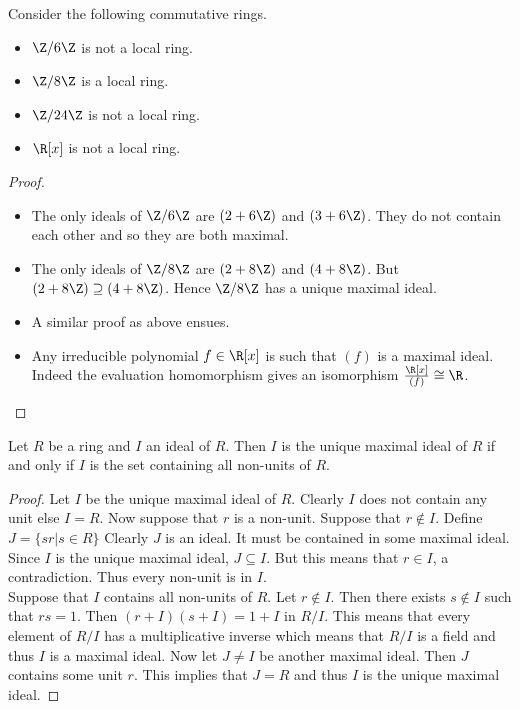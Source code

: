 \documentclass[a4paper]{article}
\begin{document}
\begin{eg}{}{} Consider the following commutative rings. 
\begin{itemize}
\item $\Z/6\Z$ is not a local ring. 
\item $\Z/8\Z$ is a local ring. 
\item $\Z/24\Z$ is not a local ring. 
\item $\R[x]$ is not a local ring. 
\end{itemize} 
\begin{proof}
\begin{itemize}
\item The only ideals of $\Z/6\Z$ are $(2+6\Z)$ and $(3+6\Z)$. They do not contain each other and so they are both maximal. 
\item The only ideals of $\Z/8\Z$ are $(2+8\Z)$ and $(4+8\Z)$. But $(2+8\Z)\supseteq(4+8\Z)$. Hence $\Z/8\Z$ has a unique maximal ideal. 
\item A similar proof as above ensues. 
\item Any irreducible polynomial $f\in\R[x]$ is such that $(f)$ is a maximal ideal. Indeed the evaluation homomorphism gives an isomorphism $\frac{\R[x]}{(f)}\cong\R$. 
\end{itemize}
\end{proof}
\end{eg}

\begin{prp}{}{} Let $R$ be a ring and $I$ an ideal of $R$. Then $I$ is the unique maximal ideal of $R$ if and only if $I$ is the set containing all non-units of $R$. 
\begin{proof}
Let $I$ be the unique maximal ideal of $R$. Clearly $I$ does not contain any unit else $I=R$. Now suppose that $r$ is a non-unit. Suppose that $r\notin I$. Define $J=\{sr|s\in R\}$ Clearly $J$ is an ideal. It must be contained in some maximal ideal. Since $I$ is the unique maximal ideal, $J\subseteq I$. But this means that $r\in I$, a contradiction. Thus every non-unit is in $I$. \\
Suppose that $I$ contains all non-units of $R$. Let $r\notin I$. Then there exists $s\notin I$ such that $rs=1$. Then $(r+I)(s+I)=1+I$ in $R/I$. This means that every element of $R/I$ has a multiplicative inverse which means that $R/I$ is a field and thus $I$ is a maximal ideal. Now let $J\neq I$ be another maximal ideal. Then $J$ contains some unit $r$. This implies that $J=R$ and thus $I$ is the unique maximal ideal. 
\end{proof}
\end{prp}
\end{document}
